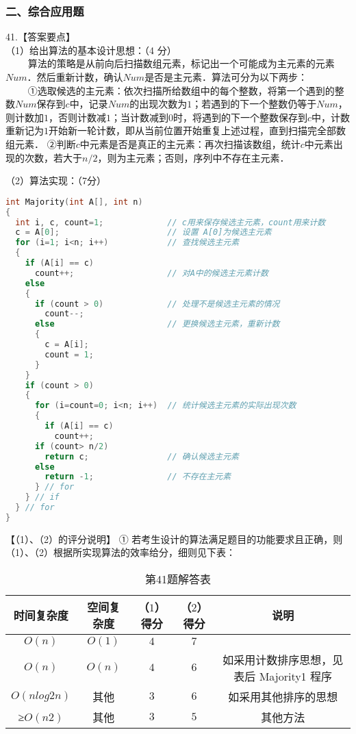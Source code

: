 \subsubsection{二、综合应用题}

41.【答案要点】 \\
（1）给出算法的基本设计思想：（4 分） \\
$\qquad$ 算法的策略是从前向后扫描数组元素，标记出一个可能成为主元素的元素$Num$．然后重新计数，确认$Num$是否是主元素．算法可分为以下两步： \\
$\qquad$ ①选取候选的主元素：依次扫描所给数组中的每个整数，将第一个遇到的整数$Num$保存到$c$中，记录$Num$的出现次数为$1$；若遇到的下一个整数仍等于$Num$，则计数加$1$，否则计数减$1$；当计数减到$0$时，将遇到的下一个整数保存到$c$中，计数重新记为$1$开始新一轮计数，即从当前位置开始重复上述过程，直到扫描完全部数组元素． 
②判断$c$中元素是否是真正的主元素：再次扫描该数组，统计$c$中元素出现的次数，若大于$n/2$，则为主元素；否则，序列中不存在主元素．

（2）算法实现：（7分）
\begin{lstlisting}[language=cpp]
int Majority(int A[], int n)
{ 
  int i, c, count=1;             // c用来保存候选主元素，count用来计数
  c = A[0];                      // 设置 A[0]为候选主元素
  for (i=1; i<n; i++)            // 查找候选主元素
  {
    if (A[i] == c)
      count++;                   // 对A中的候选主元素计数
    else
    {
      if (count > 0)             // 处理不是候选主元素的情况
        count--;
      else                       // 更换候选主元素，重新计数
      {
        c = A[i]; 
        count = 1; 
      }
    }
    if (count > 0)
    {
      for (i=count=0; i<n; i++)  // 统计候选主元素的实际出现次数
      {
        if (A[i] == c)
          count++; 
      if (count> n/2)
        return c;                // 确认候选主元素
      else
        return -1;               // 不存在主元素 
      } // for
    } // if
  } // for
}
\end{lstlisting}

【（1）、（2）的评分说明】
① 若考生设计的算法满足题目的功能要求且正确，则（1）、（2）根据所实现算法的效率给分，细则见下表： 
\begin{table}[ht]
\centering
\caption{第41题解答表}\label{CSN13_tab8}
\begin{tabular}{|c|c|c|c|c|}
\hline
时间复杂度 & 空间复杂度 & （$1$）得分 & （$2$）得分 & 说明  \\
\hline
$O(n)$ & $O(1)$ & $4$ & $7$ &  \\
\hline
$O(n)$ & $O(n)$ & $4$ & $6$ & 如采用计数排序思想，见表后 Majority1 程序  \\
\hline
$O(nlog2n)$ & 其他 & $3$ & $6$ & 如采用其他排序的思想  \\
\hline
≥$O(n2)$ & 其他 & $3$ & $5$ & 其他方法  \\
\hline
\end{tabular}
\end{table}

